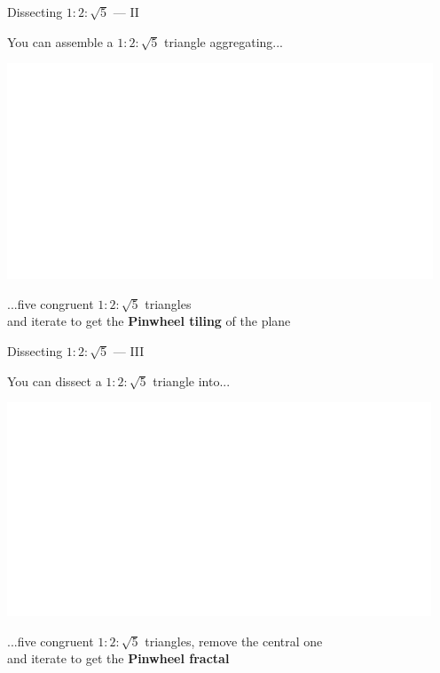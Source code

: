 \documentclass[14pt]{beamer}
\begin{document}

    \begin{frame}{Dissecting $1\!\!:\!\!2\!\!:\!\!\sqrt{5}$ --- II}
        \begin{center}
            You can assemble a $1\!\!:\!\!2\!\!:\!\!\sqrt{5}$ triangle aggregating...

            \bigskip \bigskip

            \includegraphics[height=18ex]{figures/figure006g.pdf}

            \bigskip \bigskip

            ...five congruent $1\!\!:\!\!2\!\!:\!\!\sqrt{5}$ triangles\\and iterate to get the \textbf{Pinwheel tiling} of the plane
        \end{center}
    \end{frame}


    \begin{frame}{Dissecting $1\!\!:\!\!2\!\!:\!\!\sqrt{5}$ --- III}
        \begin{center}
            You can dissect a $1\!\!:\!\!2\!\!:\!\!\sqrt{5}$ triangle into...

            \bigskip \bigskip

            \includegraphics[height=18ex]{figures/figure006h.pdf}

            \bigskip \bigskip

            ...five congruent $1\!\!:\!\!2\!\!:\!\!\sqrt{5}$ triangles, remove the central one\\and iterate to get the \textbf{Pinwheel fractal}
        \end{center}
    \end{frame}
\end{document}
